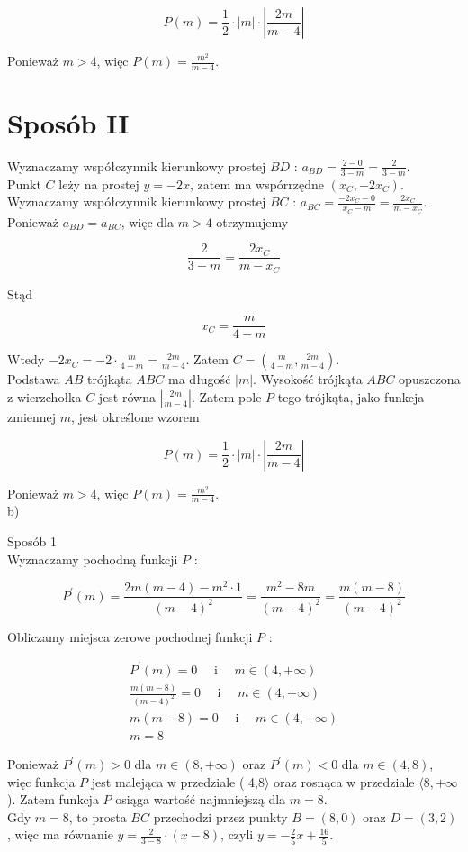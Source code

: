 \documentclass[10pt]{article}
\begin{document}
$$
P(m)=\frac{1}{2} \cdot|m| \cdot\left|\frac{2 m}{m-4}\right|
$$

Ponieważ $m>4$, więc $P(m)=\frac{m^{2}}{m-4}$.

\section*{Sposób II}
Wyznaczamy współczynnik kierunkowy prostej $B D$ : $a_{B D}=\frac{2-0}{3-m}=\frac{2}{3-m}$.\\
Punkt $C$ leży na prostej $y=-2 x$, zatem ma wspórrzędne $\left(x_{C},-2 x_{C}\right)$.\\
Wyznaczamy współczynnik kierunkowy prostej $B C$ : $a_{B C}=\frac{-2 x_{C}-0}{x_{C}-m}=\frac{2 x_{C}}{m-x_{C}}$.\\
Ponieważ $a_{B D}=a_{B C}$, więc dla $m>4$ otrzymujemy

$$
\frac{2}{3-m}=\frac{2 x_{C}}{m-x_{C}}
$$

Stąd

$$
x_{C}=\frac{m}{4-m}
$$

Wtedy $-2 x_{C}=-2 \cdot \frac{m}{4-m}=\frac{2 m}{m-4}$. Zatem $C=\left(\frac{m}{4-m}, \frac{2 m}{m-4}\right)$.\\
Podstawa $A B$ trójkąta $A B C$ ma długość $|m|$. Wysokość trójkąta $A B C$ opuszczona z wierzchołka $C$ jest równa $\left|\frac{2 m}{m-4}\right|$. Zatem pole $P$ tego trójkąta, jako funkcja zmiennej $m$, jest określone wzorem

$$
P(m)=\frac{1}{2} \cdot|m| \cdot\left|\frac{2 m}{m-4}\right|
$$

Ponieważ $m>4$, więc $P(m)=\frac{m^{2}}{m-4}$.\\
b)

Sposób 1\\
Wyznaczamy pochodną funkcji $P$ :

$$
P^{\prime}(m)=\frac{2 m(m-4)-m^{2} \cdot 1}{(m-4)^{2}}=\frac{m^{2}-8 m}{(m-4)^{2}}=\frac{m(m-8)}{(m-4)^{2}}
$$

Obliczamy miejsca zerowe pochodnej funkcji $P$ :

$$
\begin{gathered}
P^{\prime}(m)=0 \quad \text { i } \quad m \in(4,+\infty) \\
\frac{m(m-8)}{(m-4)^{2}}=0 \quad \text { i } \quad m \in(4,+\infty) \\
m(m-8)=0 \quad \text { i } \quad m \in(4,+\infty) \\
m=8
\end{gathered}
$$

Ponieważ $P^{\prime}(m)>0$ dla $m \in(8,+\infty)$ oraz $P^{\prime}(m)<0$ dla $m \in(4,8)$, więc funkcja $P$ jest malejąca w przedziale ( 4,8$\rangle$ oraz rosnąca w przedziale $\langle 8,+\infty$ ). Zatem funkcja $P$ osiąga wartość najmniejszą dla $m=8$.\\
Gdy $m=8$, to prosta $B C$ przechodzi przez punkty $B=(8,0)$ oraz $D=(3,2)$, więc ma równanie $y=\frac{2}{3-8} \cdot(x-8)$, czyli $y=-\frac{2}{5} x+\frac{16}{5}$.
\end{document}
